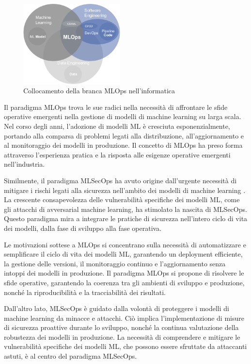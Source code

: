 \begin{figure}[h]
    \centering
    \includegraphics[width=200px]{figures/ch1/mlops-flow.png}
    \caption[Intersezione fra Machine Learning, DevOps e Data Engineering]{Collocamento della branca MLOps nell'informatica}
    \label{fig:cha1:mlops}
\end{figure}

Il paradigma MLOps \cite{mlops} trova le sue radici nella necessità di affrontare le sfide operative emergenti nella gestione di modelli di machine learning su larga scala. Nel corso degli anni, l'adozione di modelli ML è cresciuta esponenzialmente, portando alla comparsa di problemi legati alla distribuzione, all'aggiornamento e al monitoraggio dei modelli in produzione. Il concetto di MLOps ha preso forma attraverso l'esperienza pratica e la risposta alle esigenze operative emergenti nell'industria.

Similmente, il paradigma MLSecOps ha avuto origine dall'urgente necessità di mitigare i rischi legati alla sicurezza nell'ambito dei modelli di machine learning \cite{adv_ml_1}. La crescente consapevolezza delle vulnerabilità specifiche dei modelli ML, come gli attacchi di avversarial machine learning, ha stimolato la nascita di MLSecOps. Questo paradigma mira a integrare le pratiche di sicurezza nell'intero ciclo di vita dei modelli, dalla fase di sviluppo alla fase operativa.

Le motivazioni sottese a MLOps si concentrano sulla necessità di automatizzare e semplificare il ciclo di vita dei modelli ML, garantendo un deployment efficiente, la gestione delle versioni, il monitoraggio continuo e l'aggiornamento senza intoppi dei modelli in produzione. Il paradigma MLOps si propone di risolvere le sfide operative, garantendo la coerenza tra gli ambienti di sviluppo e produzione, nonché la riproducibilità e la tracciabilità dei risultati.

Dall'altro lato, MLSecOps è guidato dalla volontà di proteggere i modelli di machine learning da minacce e attacchi. Ciò implica l'implementazione di misure di sicurezza proattive durante lo sviluppo, nonché la continua valutazione della robustezza dei modelli in produzione. La necessità di comprendere e mitigare le vulnerabilità specifiche dei modelli ML, che possono essere sfruttate da attaccanti astuti, è al centro del paradigma MLSecOps.

